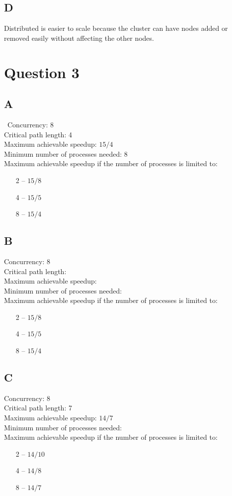 \documentclass[12pt]{article}
\begin{document}
    \subsection*{D}
    Distributed is easier to scale because the cluster can have nodes added or removed easily without affecting the other nodes.
    \section{Question 3}
    \subsection*{A}\
    \noindent Concurrency: 8\\
    Critical path length: 4\\
    Maximum achievable speedup: \(15/4\) \\
    Minimum number of processes needed: 8\\
    Maximum achievable speedup if the number of processes is limited to: 
    \begin{itemize}
        \item[2]-- \(15/8\)
        \item[4]-- \(15/5\)
        \item[8]-- \(15/4\)
    \end{itemize}
    \subsection*{B}
    Concurrency: 8\\
    Critical path length: \\
    Maximum achievable speedup: \\
    Minimum number of processes needed: \\
    Maximum achievable speedup if the number of processes is limited to:
    \begin{itemize}
        \item[2]-- \(15/8\)
        \item[4]-- \(15/5\)
        \item[8]-- \(15/4\)
    \end{itemize}
    \subsection*{C}
    Concurrency: 8\\
    Critical path length: 7\\
    Maximum achievable speedup: \(14/7\)\\
    Minimum number of processes needed: \\
    Maximum achievable speedup if the number of processes is limited to:
    \begin{itemize}
        \item[2]-- \(14/10\)
        \item[4]-- \(14/8\)
        \item[8]-- \(14/7\)  
    \end{itemize}
\end{document}
